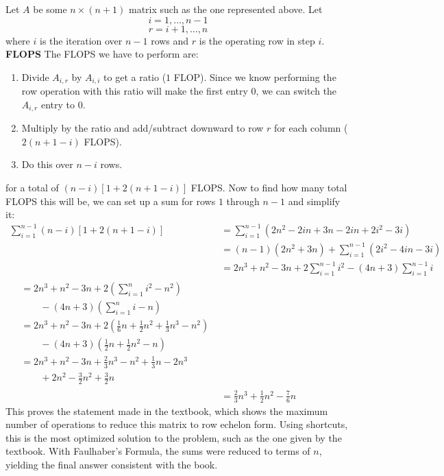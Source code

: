 \documentclass{article}
\begin{document}
Let $A$ be some $n\times(n+1)$ matrix such as the one represented above. Let  
\[i=1,\ldots,n-1\] 
\[r=i+1,\ldots,n\] 
\newline
where $i$ is the iteration over $n-1$ rows and $r$ is the operating row in step $i$.
\pagebreak
\newline
{\large{\bf{FLOPS}}}
\newline
\newline
The FLOPS we have to perform are:
\begin{enumerate}
  \item Divide $A_{i,r}$ by $A_{i,i}$ to get a ratio ($1$ FLOP). Since we know performing the row operation with this ratio will make the first entry $0$, we can switch the $A_{i,r}$ entry to $0$. 
  \item Multiply by the ratio and add/subtract downward to row $r$ for each column ($2(n+1-i)$ FLOPS).
  \item Do this over $n-i$ rows.
\end{enumerate} 
for a total of $(n-i)[1+2(n+1-i)]$ FLOPS. Now to find how many total FLOPS this will be, we can set up a sum for rows $1$ through $n-1$ and simplify it:
\begin{align*}
\sum_{i=1}^{n-1}(n-i)[1+2(n+1-i)]&=\sum_{i=1}^{n-1}(2n^2-2in+3n-2in+2i^2-3i) \\
&=(n-1)(2n^2+3n)+\sum_{i=1}^{n-1}(2i^2-4in-3i) \\
&=2n^3+n^2-3n+2\sum_{i=1}^{n-1}i^2-(4n+3)\sum_{i=1}^{n-1}i \\
\begin{split}
&=2n^3+n^2-3n+2(\sum_{i=1}^{n}i^2-n^2) \\
&\qquad-(4n+3)(\sum_{i=1}^{n}i-n) \\
&=2n^3+n^2-3n+2(\frac{1}{6}n+\frac{1}{2}n^2+\frac{1}{3}n^3-n^2) \\
&\qquad-(4n+3)(\frac{1}{2}n+\frac{1}{2}n^2-n) \\
&=2n^3+n^2-3n+\frac{2}{3}n^3-n^2+\frac{1}{3}n-2n^3 \\
&\qquad+2n^2-\frac{3}{2}n^2+\frac{3}{2}n
\end{split} \\
&=\frac{2}{3}n^3+\frac{1}{2}n^2-\frac{7}{6}n
\end{align*}
\newline
This proves the statement made in the textbook, which shows the maximum number of operations to reduce this matrix to row echelon form. Using shortcuts, this is the most optimized solution to the problem, such as the one given by the textbook. With Faulhaber's Formula, the sums were reduced to terms of $n$, yielding the final answer consistent with the book.  
\end{document}
